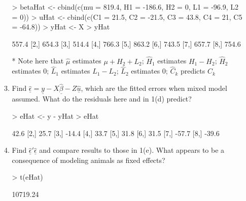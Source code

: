 \documentclass[12pt,a4paper]{paper}
\begin{document}
\begin{enumerate}
\begin{enumerate}
\begin{Schunk}
\begin{Sinput}
> betaHat <- cbind(c(mu = 819.4, H1 = -186.6, H2 = 0, L1 = -96.9, L2 = 0))
> uHat <- cbind(c(C1 = 21.5, C2 = -21.5, C3 = 43.8, C4 = 21,  C5 = -64.8))
> yHat <- X %*% betaHat + Z %*% uHat
> yHat
\end{Sinput}
\begin{Soutput}
      [,1]
[1,] 557.4
[2,] 654.3
[3,] 514.4
[4,] 766.3
[5,] 863.2
[6,] 743.5
[7,] 657.7
[8,] 754.6
\end{Soutput}
\end{Schunk}
\item[*] Note here that $\hat{\mu}$ estimates $\mu + H_{2} + L_{2}$; $\hat{H}_{1}$ estimates $H_{1} - H_{2}$; $\hat{H}_{2}$ estimates $0$; $\hat{L}_{1}$ estimates $L_{1} - L_{2}$; $\hat{L}_{2}$ estimates $0$; $\hat{C}_{k}$ predicts $C_{k}$
\item Find $\underline{\hat{\epsilon}} = \underline{y} - X\underline{\hat{\beta}} - Z\underline{\hat{u}}$, which are the fitted errors when mixed model assumed. What do the residuals here and in 1(d) predict?
\begin{Schunk}
\begin{Sinput}
> eHat <- y - yHat
> eHat
\end{Sinput}
\begin{Soutput}
      [,1]
[1,]  42.6
[2,]  25.7
[3,] -14.4
[4,]  33.7
[5,]  31.8
[6,]  31.5
[7,] -57.7
[8,] -39.6
\end{Soutput}
\end{Schunk}
\item Find $\underline{\hat{\epsilon}}'\underline{\hat{\epsilon}}$ and compare results to those in 1(e). What appears to be a consequence of modeling animals as fixed effects?
\begin{Schunk}
\begin{Sinput}
> t(eHat) %*% eHat
\end{Sinput}
\begin{Soutput}
         [,1]
[1,] 10719.24
\end{Soutput}
\end{Schunk}
\end{enumerate}
\end{enumerate}
\end{document}
